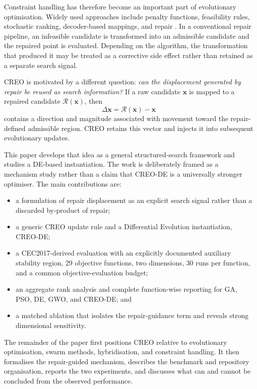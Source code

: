 \documentclass[a4paper,fleqn]{cas-sc}
\begin{document}
Constraint handling has therefore become an important part of evolutionary optimisation. Widely used approaches include penalty functions, feasibility rules, stochastic ranking, decoder-based mappings, and repair \cite{coello2002theoretical,deb2000efficient,runarsson2000stochastic,mezura2011constraint,michalewicz1996constrained,koziel1999homomorphous}. In a conventional repair pipeline, an infeasible candidate is transformed into an admissible candidate and the repaired point is evaluated. Depending on the algorithm, the transformation that produced it may be treated as a corrective side effect rather than retained as a separate search signal.

CREO is motivated by a different question: \emph{can the displacement generated by repair be reused as search information?} If a raw candidate $\mathbf{x}$ is mapped to a repaired candidate $\mathcal{R}(\mathbf{x})$, then
\begin{equation}
\Delta \mathbf{x}=\mathcal{R}(\mathbf{x})-\mathbf{x}
\end{equation}
contains a direction and magnitude associated with movement toward the repair-defined admissible region. CREO retains this vector and injects it into subsequent evolutionary updates.

This paper develops that idea as a general structured-search framework and studies a DE-based instantiation. The work is deliberately framed as a mechanism study rather than a claim that CREO-DE is a universally stronger optimiser. The main contributions are:
\begin{itemize}
    \item a formulation of repair displacement as an explicit search signal rather than a discarded by-product of repair;
    \item a generic CREO update rule and a Differential Evolution instantiation, CREO-DE;
    \item a CEC2017-derived evaluation with an explicitly documented auxiliary stability region, 29 objective functions, two dimensions, 30 runs per function, and a common objective-evaluation budget;
    \item an aggregate rank analysis and complete function-wise reporting for GA, PSO, DE, GWO, and CREO-DE; and
    \item a matched ablation that isolates the repair-guidance term and reveals strong dimensional sensitivity.
\end{itemize}

The remainder of the paper first positions CREO relative to evolutionary optimisation, swarm methods, hybridisation, and constraint handling. It then formalises the repair-guided mechanism, describes the benchmark and repository organisation, reports the two experiments, and discusses what can and cannot be concluded from the observed performance.
\end{document}
